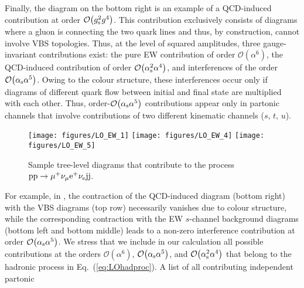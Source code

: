 \documentclass[a4article,11pt]{article}
\begin{document}
Finally, the
diagram on the bottom right is an example of a QCD-induced contribution at
order $\mathcal{O}{\left(g_{\rm s}^2 g^{4}\right)}$.  This
contribution exclusively consists of diagrams where a gluon is
connecting the two quark lines and thus, by construction, cannot
involve VBS topologies.  Thus, at the level of squared amplitudes,
three gauge-invariant contributions exist: the pure EW contribution of
order $\mathcal{O}{\left(\alpha^{6}\right)}$, the QCD-induced
contribution of order $\mathcal{O}{\left(\alpha_{\rm
      s}^{2}\alpha^{4}\right)}$, and 
interferences of the order
$\mathcal{O}{\left(\alpha_\text{s}\alpha^{5}\right)}$.  
Owing to the colour structure, these interferences
occur only if diagrams of different quark flow between initial and
final state are multiplied with each other.
Thus, order-$\mathcal{O}{\left(\alpha_\text{s}\alpha^{5}\right)}$ contributions appear
only in partonic channels that involve contributions of two different
kinematic channels ($s$, $t$, $u$).
\begin{figure}[t]
\begin{center}
          \texttt{[image: figures/LO\_EW\_1]}
          \texttt{[image: figures/LO\_EW\_4]}
          \texttt{[image: figures/LO\_EW\_5]}\\[2ex]
\end{center}
        \caption{Sample tree-level diagrams that contribute to the
          process
          $\text{p}\text{p}\to\mu^+\nu_\mu\text{e}^+\nu_{\text{e}}\text{j}\text{j}$.}
\label{diag:LO}
\end{figure}
For example, in , the contraction of the QCD-induced
diagram (bottom right) with the 
VBS diagrams (top row) necessarily vanishes due
to colour structure, while the corresponding contraction with the EW
$s$-channel background diagrams (bottom left and bottom middle) 
leads to a non-zero interference contribution at order $\mathcal{O}{\left(\alpha_{\rm s}\alpha^{5}\right)}$.
We stress that we include in our
calculation all possible contributions at the orders
$\mathcal{O}{\left(\alpha^{6}\right)}$, $\mathcal{O}{\left(\alpha_{\rm
        s}\alpha^{5}\right)}$, and $\mathcal{O}{\left(\alpha_{\rm
      s}^{2}\alpha^{4}\right)}$ that belong to the hadronic process in
Eq.~(\ref{eq:LOhadproc}).  A list of all contributing independent partonic
\end{document}

